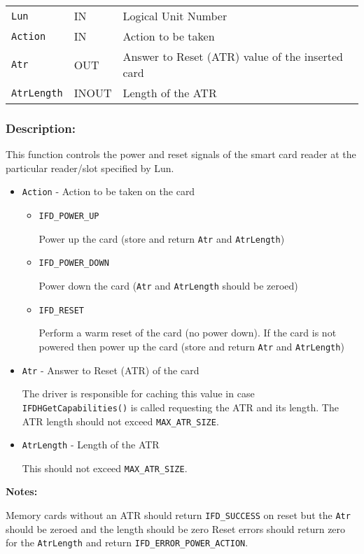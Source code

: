 \documentclass[a4paper,12pt]{article}
\newcommand{\desc}{\subsubsection{Description:}}
\begin{document}
\begin{tabular}{lll}
\texttt{Lun} & IN & Logical Unit Number\\
\texttt{Action} & IN & Action to be taken\\
\texttt{Atr} & OUT & Answer to Reset (ATR) value of the inserted card\\
\texttt{AtrLength} & INOUT & Length of the ATR\\
\end{tabular}

\desc

This function controls the power and reset signals of the smart card
reader at the particular reader/slot specified by Lun.

\begin{itemize}
\item \texttt{Action} - Action to be taken on the card

\begin{itemize}
\item \texttt{IFD\_POWER\_UP}

Power up the card (store and return \texttt{Atr} and \texttt{AtrLength})

\item \texttt{IFD\_POWER\_DOWN}

Power down the card (\texttt{Atr} and \texttt{AtrLength} should be
zeroed)

\item \texttt{IFD\_RESET}

Perform a warm reset of the card (no power down). If the card is not
powered then power up the card (store and return \texttt{Atr} and
\texttt{AtrLength})

\end{itemize}

\item \texttt{Atr} - Answer to Reset (ATR) of the card

The driver is responsible for caching this value in case
\texttt{IFDHGetCapabilities()} is called requesting the ATR and its
length. The ATR length should not exceed \texttt{MAX\_ATR\_SIZE}.

\item \texttt{AtrLength} - Length of the ATR

This should not exceed \texttt{MAX\_ATR\_SIZE}.

\end{itemize}

\textbf{Notes:}

Memory cards without an ATR should return \texttt{IFD\_SUCCESS} on reset
but the \texttt{Atr} should be zeroed and the length should be zero
Reset errors should return zero for the \texttt{AtrLength} and return
\texttt{IFD\_ERROR\_POWER\_ACTION}.
\end{document}
